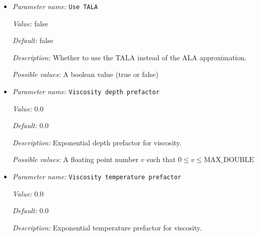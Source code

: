 \begin{itemize}
{\it Value:} 1.0


{\it Default:} 1.0


{\it Description:} The value of the specific heat $C_p$. Units: $J/kg/K$.


{\it Possible values:} A floating point number $v$ such that $0 \leq v \leq \text{MAX\_DOUBLE}$
\item {\it Parameter name:} {\tt Use TALA}
\label{parameters:Material model/Nondimensional model/Use TALA}
\label{parameters:Material_20model/Nondimensional_20model/Use_20TALA}


{\it Value:} false


{\it Default:} false


{\it Description:} Whether to use the TALA instead of the ALA approximation.


{\it Possible values:} A boolean value (true or false)
\item {\it Parameter name:} {\tt Viscosity depth prefactor}
\label{parameters:Material model/Nondimensional model/Viscosity depth prefactor}
\label{parameters:Material_20model/Nondimensional_20model/Viscosity_20depth_20prefactor}


{\it Value:} 0.0


{\it Default:} 0.0


{\it Description:} Exponential depth prefactor for viscosity.


{\it Possible values:} A floating point number $v$ such that $0 \leq v \leq \text{MAX\_DOUBLE}$
\item {\it Parameter name:} {\tt Viscosity temperature prefactor}
\label{parameters:Material model/Nondimensional model/Viscosity temperature prefactor}
\label{parameters:Material_20model/Nondimensional_20model/Viscosity_20temperature_20prefactor}


{\it Value:} 0.0


{\it Default:} 0.0


{\it Description:} Exponential temperature prefactor for viscosity.



\end{itemize}
